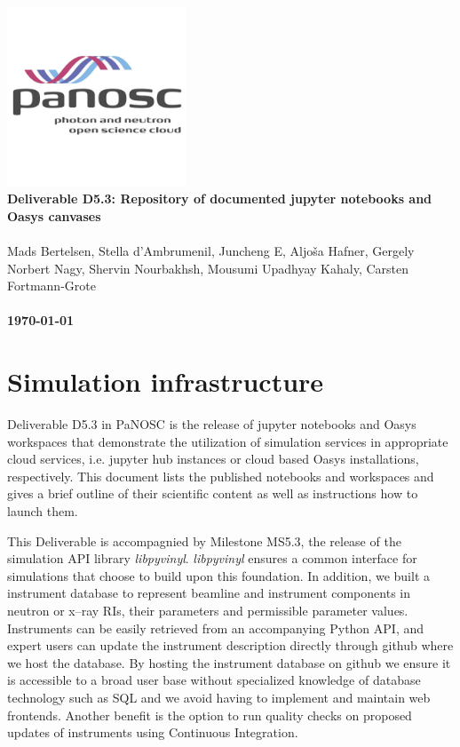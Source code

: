 \documentclass[10pt]{scrartcl}
\begin{document}
\makeatletter
\begin{titlepage}
\thispagestyle{scrheadings}
\ohead{}
\ihead{}
\chead{}
\ifoot{}
\ofoot{}
\noindent%
\includegraphics[width=0.4\textwidth]{figures/PaNOSClogo_web_RGB_512x512.jpg}\\
\Huge{%
\renewcommand{\baselinestretch}{2.0}%
  \textbf{%
    Deliverable D5.3: Repository of documented jupyter notebooks and Oasys canvases\\
  }%
}%
\\
{%
\Large{%
  Mads Bertelsen,
  Stella d'Ambrumenil,
  Juncheng E,
  Aljo\v{s}a Hafner,
  Gergely Norbert Nagy,
  Shervin Nourbakhsh,
  Mousumi Upadhyay Kahaly,
  Carsten Fortmann-Grote
  \bigskip\\
  \bigskip\\
  \textbf{\today}%
}}%
\end{titlepage}
\makeatother

\section{Simulation infrastructure}
Deliverable D5.3 in PaNOSC is the release of jupyter notebooks and Oasys
workspaces
that demonstrate the utilization of simulation services in appropriate cloud
services, i.e. jupyter hub instances or cloud based Oasys installations,
respectively. This document lists the published notebooks and workspaces and
gives a brief outline of their scientific content as well as instructions how to
launch them.

This Deliverable is accompagnied by Milestone MS5.3, the release of the
simulation API library \textit{libpyvinyl}. \textit{libpyvinyl}
ensures a common interface for
simulations that choose to build upon this foundation. In addition, we built
a instrument database to represent beamline and instrument components in neutron
or x--ray RIs, their parameters and permissible parameter values.
Instruments can be easily retrieved from an
accompanying Python API, and expert users can update the instrument description
directly through github where we host the database. By hosting the instrument
database on github we ensure it is accessible to a broad user base without
specialized knowledge of database technology such as SQL and we avoid having to
implement and maintain web frontends. Another benefit is the
option to run quality checks on proposed updates of instruments using
Continuous Integration.
\end{document}
